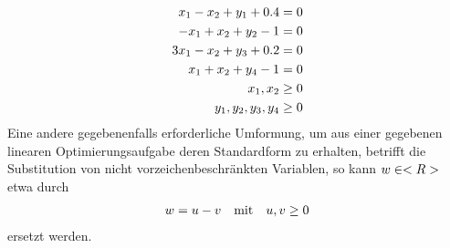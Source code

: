 \begin{example}
\begin{align}
		x_1-x_2+y_1+0.4 &= 0 \notag \\
		-x_1+x_2+y_2-1 &= 0 \notag \\
		3x_1-x_2+y_3+0.2 &= 0\notag \\
		x_1+x_2+y_4-1 &= 0\notag \\
		x_1,x_2 &\ge 0\notag \\
		y_1,y_2,y_3,y_4 &\ge 0 \notag
	\end{align}
	Eine andere gegebenenfalls erforderliche Umformung, um aus einer gegebenen linearen Optimierungsaufgabe deren Standardform zu erhalten, betrifft die Substitution von nicht vorzeichenbeschränkten Variablen, so kann $w\in<R>$ etwa durch
	\begin{align}
		w = u-v\quad\text{mit}\quad u,v\ge 0\notag
	\end{align}
	ersetzt werden.
\end{example}